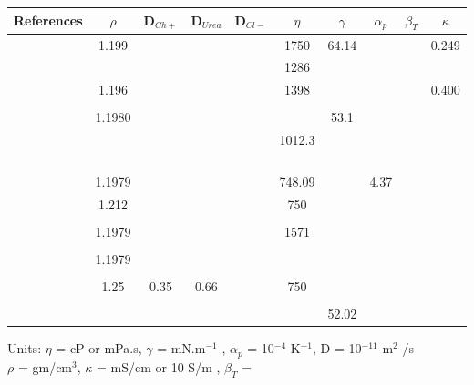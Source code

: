 \documentclass[11pt]{article}
\begin{document}
     \clearpage
     \thispagestyle{empty}
     \begin{landscape}
          \centering
          \begin{tabular}{|c|c|c|c|c|c|c|c|c|c|}\hline
            References & $\rho$ & D$_{Ch+}$ & D$_{Urea}$ & D$_{Cl-}$& $\eta$ & $\gamma$  & $\alpha_{p}$ & $\beta_{T}$ & $\kappa$   \\ \hline
          \cite{Lapena2020}&1.199 & & & & 1750 &64.14 & & & 0.249  \\ \hline
          \cite{Gilmore2019}& & & & & 1286 & & & & \\ \hline 
          \cite{Agieienko2019}& 1.196& & & & 1398& & & & 0.400 \\ \hline
          \cite{Dhingra2019}& & & & & & & & & \\ \hline
          \cite{Komal2018}&1.1980 & & & & &  53.1 & & & \\ \hline
          \cite{Mirza2017}& & & & &1012.3 & & & & \\ \hline
          \cite{Jabbar2017}& & & & & & & & & \\ \hline
          \cite{Dietz2017}& & & & & & & & & \\ \hline
          \cite{Mjalli2016_1}& & & & & & & & & \\ \hline
          \cite{Mjalli2016_2}& & & & & & & & & \\ \hline
          \cite{Chemat2016}&1.1979 & & & &748.09 & & 4.37 & & \\ \hline
          \cite{Mjalli2014}&1.212 & & & &750 & & & & \\ \hline
          \cite{Yadav2014}& & & & & & & & & \\ \hline
          \cite{Xie2014}&1.1979 & & & &1571 & & & &  \\ \hline
          \cite{Shah2014}& &  & & &  & & & &  \\ \hline
          \cite{Leron2012_1}& 1.1979 & & & & & & & & \\ \hline
          \cite{Leron2012_2}& & & & & & & & & \\ \hline
          \cite{D'Agostino2011}&1.25 & 0.35 & 0.66& & 750 & & & & \\ \hline
          \cite{Su2009}& & & & & & & & & \\ \hline
          \cite{Abbott2003}& & & & & &52.02 & & & \\ \hline
          \end{tabular}
          Units: $\eta$ = cP or mPa.s, $\gamma$ = mN.m$^{-1}$ , $\alpha_{p}$  = 10$^{-4}$ K$^{-1}$, D = 10$^{-11}$ m$^{2}$ /s\\
          $\rho$ = gm/cm$^{3}$, $\kappa$ = mS/cm or 10 S/m , $\beta_{T}$ = 
     \end{landscape}
\end{document}

